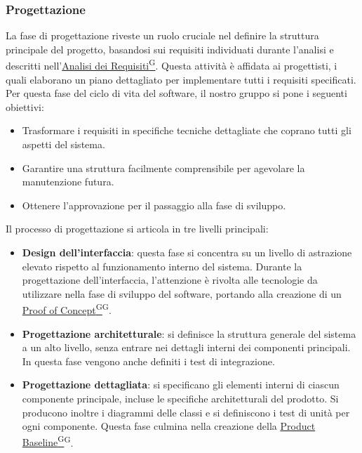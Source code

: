 \subsubsection{Progettazione}
La fase di progettazione riveste un ruolo cruciale nel definire la struttura principale del progetto, 
basandosi sui requisiti individuati durante l'analisi e descritti 
nell’\href{https://code7crusaders.github.io/docs/PB/documentazione_interna/glossario.html#analisi-dei-requisiti}{Analisi dei Requisiti\textsuperscript{G}}. 
Questa attività è affidata ai progettisti, i quali elaborano un piano dettagliato per implementare tutti i requisiti specificati.  
Per questa fase del ciclo di vita del software, il nostro gruppo si pone i seguenti obiettivi:
\begin{itemize}
    \item Trasformare i requisiti in specifiche tecniche dettagliate che coprano tutti gli aspetti del sistema.
    \item Garantire una struttura facilmente comprensibile per agevolare la manutenzione futura.
    \item Ottenere l’approvazione per il passaggio alla fase di sviluppo.
\end{itemize}
Il processo di progettazione si articola in tre livelli principali:
\begin{itemize}
    \item \textbf{Design dell’interfaccia}: questa fase si concentra su un livello di astrazione elevato rispetto al 
    funzionamento interno del sistema. Durante la progettazione dell’interfaccia, l’attenzione è rivolta alle 
    tecnologie da utilizzare nella fase di sviluppo del software, portando alla creazione di 
    un \href{https://code7crusaders.github.io/docs/PB/documentazione_interna/glossario.html#poc-proof-of-concept}{Proof of Concept\textsuperscript{G}}\textsuperscript{G}.
    \item \textbf{Progettazione architetturale}: si definisce la struttura generale del sistema a un alto livello, senza 
    entrare nei dettagli interni dei componenti principali. In questa fase vengono anche definiti i test di integrazione.
    \item \textbf{Progettazione dettagliata}: si specificano gli elementi interni di ciascun componente principale, 
    incluse le specifiche architetturali del prodotto. Si producono inoltre i diagrammi delle classi e si definiscono 
    i test di unità per ogni componente. Questa fase culmina nella creazione 
    della \href{https://code7crusaders.github.io/docs/PB/documentazione_interna/glossario.html#pb-product-baseline}{Product Baseline\textsuperscript{G}}\textsuperscript{G}.
\end{itemize}


